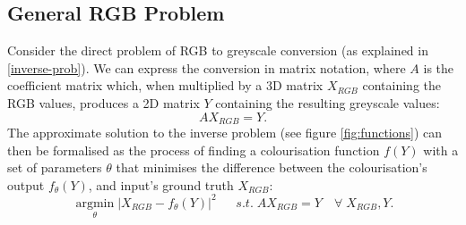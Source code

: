 \documentclass{l4proj}
\begin{document}
\subsection{General RGB Problem}
Consider the direct problem of RGB to greyscale conversion (as explained in \ref{inverse-prob}). We can express the conversion in matrix notation, where $A$ is the coefficient matrix which, when multiplied by a 3D matrix $X_{RGB}$ containing the RGB values, produces a 2D matrix $Y$ containing the resulting greyscale values:
\begin{equation}
    A X_{RGB} = Y.
\end{equation}
The approximate solution to the inverse problem (see figure \ref{fig:functions}) can then be formalised as the process of finding a colourisation function $f(Y)$ with a set of parameters $\theta$ that minimises the difference between the colourisation's output $f_{\theta}(Y)$, and input's ground truth $X_{RGB}$:
\begin{equation}
    \underset{\theta}{\operatorname{arg min}} |X_{RGB}-f_{\theta}(Y)|^2 \quad\;\; s.t. \; A X_{RGB} = Y \quad \forall \; X_{RGB}, Y.
\end{equation}
\end{document}

